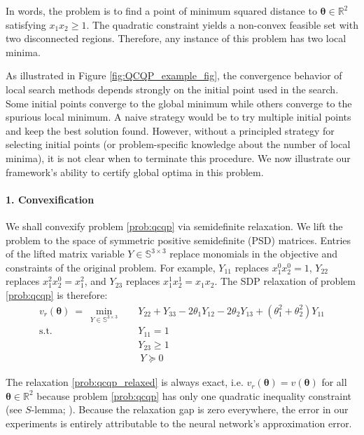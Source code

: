 \documentclass[10pt]{article} %
\theoremstyle{plain}
\theoremstyle{definition}
\theoremstyle{remark}
\begin{document}
In words, the problem is to find a point of minimum squared distance to $\bm{\theta} \in \mathbb{R}^2$ satisfying $x_1 x_2 \geq 1$. The quadratic constraint yields a non-convex feasible set with two disconnected regions. Therefore, any instance of this problem has two local minima.

As illustrated in Figure \ref{fig:QCQP_example_fig}, the convergence behavior of local search methods depends strongly on the initial point used in the search. Some initial points converge to the global minimum while others converge to the spurious local minimum. A naive strategy would be to try multiple initial points and keep the best solution found. However, without a principled strategy for selecting initial points (or problem-specific knowledge about the number of local minima), it is not clear when to terminate this procedure. We now illustrate our framework's ability to certify global optima in this problem.

\paragraph{1. Convexification} We shall convexify problem \cref{prob:qcqp} via semidefinite relaxation. We lift the problem to the space of symmetric positive semidefinite (PSD) matrices. Entries of the lifted matrix variable $Y \in \mathbb{S}^{3 \times 3}$ replace monomials in the objective and constraints of the original problem. For example, $Y_{11}$ replaces $x_1^0 x_2^0 = 1$, $Y_{22}$ replaces $x_1^2 x_2^0 = x_1^2$, and $Y_{23}$ replaces $x_1^1 x_2^1 = x_1 x_2$. The SDP relaxation of problem \cref{prob:qcqp} is therefore:
\begin{equation}
\begin{aligned}
v_r(\bm{\theta}) ~=~ \min_{Y \in \mathbb{S}^{3 \times 3}} \quad 
&Y_{22} + Y_{33} - 2 \theta_1 Y_{12} - 2 \theta_2 Y_{13} + (\theta_1^2 + \theta_2^2) Y_{11} \\ 
\text{s.t.}\quad & Y_{11} = 1 \\[3pt]
& Y_{23} \geq 1 \\[4pt]
& ~Y \succeq 0
\end{aligned}
\label{prob:qcqp_relaxed}
\end{equation}

The relaxation \cref{prob:qcqp_relaxed} is always exact, i.e. $v_r(\bm{\theta}) = v(\bm{\theta})$ for all $\bm{\theta} \in \mathbb{R}^2$ because problem \cref{prob:qcqp}{}{} has only one quadratic inequality constraint (see $S$-lemma; \cite{boyd2004convex}). Because the relaxation gap is zero everywhere, the error in our experiments is entirely attributable to the neural network's approximation error.
\end{document}
